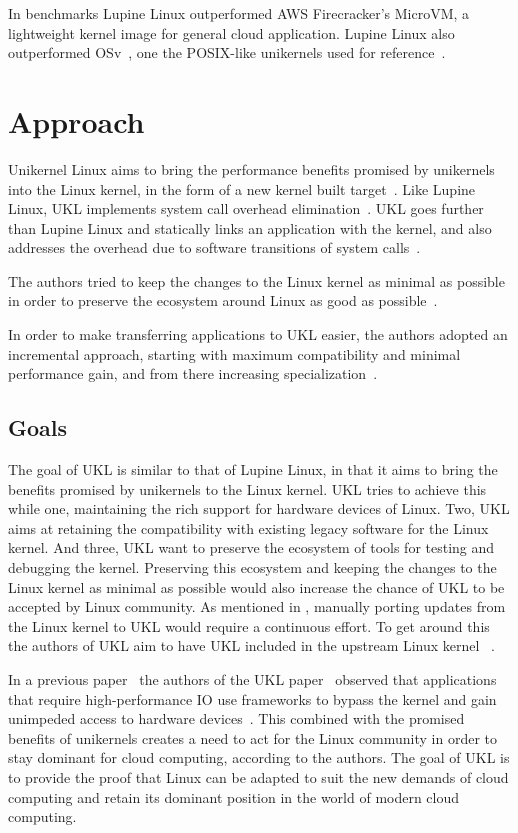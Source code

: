 \documentclass[10pt,twocolumn,a4paper]{article}
\begin{document}
    In benchmarks Lupine Linux outperformed AWS Firecracker's MicroVM, a lightweight 
    kernel image for general cloud application. 
    Lupine Linux also outperformed OSv~\cite{osv}, 
    one the POSIX-like unikernels used for reference~\cite{kuo20}.

\section{Approach}\label{sec:approach}
  Unikernel Linux aims to bring the performance benefits promised by unikernels into the Linux kernel,
  in the form of a new kernel built target~\cite{raza23}.
  Like Lupine Linux, UKL implements system call overhead elimination~\cite{raza23}.
  UKL goes further than Lupine Linux and statically links an application with the kernel,
  and also addresses the overhead due to software transitions of system calls~\cite{raza23}.

  The authors tried to keep the changes to the Linux kernel as minimal as possible
  in order to preserve the ecosystem around Linux as good as possible~\cite{raza23}.

  In order to make transferring applications to UKL easier, the authors adopted an incremental approach,
  starting with maximum compatibility and minimal performance gain, and from there increasing 
  specialization~\cite{raza23}.

  \subsection{Goals}\label{sec:goals}
    The goal of UKL is similar to that of Lupine Linux, in that it aims
    to bring the benefits promised by unikernels to the Linux kernel.
    UKL tries to achieve this while one, maintaining the rich support for hardware devices of Linux.
    Two, UKL aims at retaining the compatibility with existing legacy software for the Linux kernel.
    And three, UKL want to preserve the ecosystem of tools for testing and debugging the kernel.
    Preserving this ecosystem and keeping the changes to the Linux kernel as minimal as possible
    would also increase the chance of UKL to be accepted by Linux community.
    As mentioned in , manually porting updates from
    the Linux kernel to UKL would require a continuous effort.
    To get around this the authors of UKL aim to have UKL included in the upstream Linux kernel
   ~\cite{ukl-redhat-post}.

    In a previous paper~\cite{raza19} the authors of the UKL paper~\cite{raza23}
    observed that applications that require high-performance IO use frameworks
    to bypass the kernel and gain unimpeded access to hardware devices~\cite{raza19}.
    This combined with the promised benefits of unikernels creates a need to act
    for the Linux community in order to stay dominant for cloud computing, according to the authors.
    The goal of UKL is to provide the proof that Linux can be adapted to suit the new demands of
    cloud computing and retain its dominant position in the world of modern cloud computing.
\end{document}
